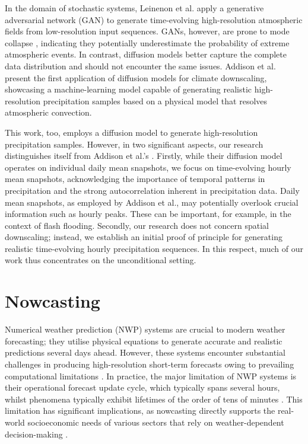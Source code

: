 \documentclass[ oneside,%
                    author={George Herbert},
                    degree={MSci},
                     title={Diffusion Models for Time-Evolving Precipitation Fields},
                  subtitle={}]{dissertation}
\begin{document}
In the domain of stochastic systems, Leinenon et al. \cite{Leinonen_Stochastic_Super-Resolution} apply a generative adversarial network (GAN) \cite{Goodfellow_Generative_Adversarial_Networks} to generate time-evolving high-resolution atmospheric fields from low-resolution input sequences. GANs, however, are prone to mode collapse \cite{Thanh-Tung_Mode_Collapse}, indicating they potentially underestimate the probability of extreme atmospheric events. In contrast, diffusion models better capture the complete data distribution and should not encounter the same issues. Addison et al. \cite{Addison_Machine_Learning_Emulation} present the first application of diffusion models for climate downscaling, showcasing a machine-learning model capable of generating realistic high-resolution precipitation samples based on a physical model that resolves atmospheric convection. 

This work, too, employs a diffusion model to generate high-resolution precipitation samples. However, in two significant aspects, our research distinguishes itself from Addison et al.'s \cite{Addison_Machine_Learning_Emulation}. Firstly, while their diffusion model operates on individual daily mean snapshots, we focus on time-evolving hourly mean snapshots, acknowledging the importance of temporal patterns in precipitation and the strong autocorrelation inherent in precipitation data. Daily mean snapshots, as employed by Addison et al., may potentially overlook crucial information such as hourly peaks. These can be important, for example, in the context of flash flooding. Secondly, our research does not concern spatial downscaling; instead, we establish an initial proof of principle for generating realistic time-evolving hourly precipitation sequences. In this respect, much of our work thus concentrates on the unconditional setting.

\section{Nowcasting}

Numerical weather prediction (NWP) systems are crucial to modern weather forecasting; they utilise physical equations to generate accurate and realistic predictions several days ahead. However, these systems encounter substantial challenges in producing high-resolution short-term forecasts owing to prevailing computational limitations \cite{Wilson_Nowcasting_Challenges}. In practice, the major limitation of NWP systems is their operational forecast update cycle, which typically spans several hours, whilst phenomena typically exhibit lifetimes of the order of tens of minutes \cite{Piece_Nowcasting}. This limitation has significant implications, as nowcasting directly supports the real-world socioeconomic needs of various sectors that rely on weather-dependent decision-making \cite{Wilson_Nowcasting_Challenges}.
\end{document}
